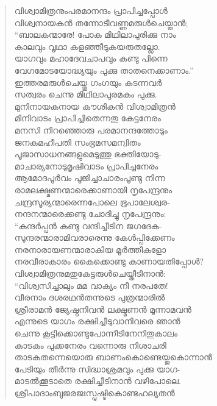 \begin{verse}
വിശ്വാമിത്രനുംപരമാനന്ദം പ്രാപിച്ചപ്പോള്‍\\
വിശ്വനായകന്‍ തന്നോടീവണ്ണമരുള്‍ചെയ്താന്‍;\\
“ബാലകന്മാരേ! പോക മിഥിലാപുരിക്കു നാം\\
കാലവും വൃഥാ കളഞ്ഞീടുകയരുതല്ലോ.\\
യാഗവും മഹാദേവചാപവും കണ്ടു പിന്നെ\\
വേഗമോടയോദ്ധ്യയും പുക്കു താതനെക്കാണാം.”\\
ഇത്തരമരുള്‍ചെയ്തു ഗംഗയും കടന്നവര്‍\\
സത്വരം ചെന്നു മിഥിലാപുരമകം പുക്കു.\\
മുനിനായകനായ കൗശികന്‍ വിശ്വാമിത്രന്‍\\
മിനിവാടം പ്രാപിച്ചിതെന്നതു കേട്ടനേരം\\
മനസി നിറഞ്ഞൊരു പരമാനന്ദത്തോടും\\
ജനകമഹീപതി സംഭ്രമസമന്വിതം\\
പൂജാസാധനങ്ങളുമെടുത്തു ഭക്തിയോടു-\\
മാചാര്യനോടുമൃഷിവാടം പ്രാപിച്ചനേരം\\
ആമോദപൂര്‍വം പൂജിച്ചാചാരംപൂണ്ടു നിന്ന\\
രാമലക്ഷ്മണന്മാരെക്കാണായി നൃപേന്ദ്രനും\\
ചന്ദ്രസൂര്യന്മാരെന്നപോലെ ഭൂപാലേശ്വര-\\
നന്ദനന്മാരെക്കണ്ടു ചോദിച്ചു നൃപേന്ദ്രനും:\\
“കന്ദര്‍പ്പന്‍ കണ്ടു വന്ദിച്ചീടിന ജഗദേക-\\
സുന്ദരന്മാരാമിവരാരെന്നു കേള്‍പ്പിക്കേണം\\
നരനാരായണന്മാരാകിയ മൂര്‍ത്തികളോ\\
നരവീരാകാരം കൈക്കൊണ്ടു കാണായതിപ്പോള്‍?\\
വിശ്വാമിത്രനുമതുകേട്ടരുള്‍ചെയ്തീടിനാന്‍:\\
“വിശ്വസിച്ചാലും മമ വാക്യം നീ നരപതേ!\\
വീരനാം ദശരഥന്‍തന്നുടെ പുത്രന്മാരില്‍\\
ശ്രീരാമന്‍ ജ്യേഷ്ഠനിവന്‍ ലക്ഷ്മണന്‍ മൂന്നാമവന്‍\\
എന്നുടെ യാഗം രക്ഷിച്ചീടുവാനിവരെ ഞാന്‍\\
ചെന്നു കൂട്ടിക്കൊണ്ടുപോന്നീടിനേനിതുകാലം\\
കാടകം പുക്കനേരം വന്നൊരു നിശാചരി\\
താടകതന്നെയൊരു ബാണംകൊണ്ടെയ്തുകൊന്നാന്‍\\
പേടിയും തീര്‍ന്നു സിദ്ധാശ്രമവും പുക്കു യാഗ-\\
മാടല്‍ക്കൂടാതെ രക്ഷിച്ചീടിനാന്‍ വഴിപോലെ.\\
ശ്രീപാദാംബുജരജഃസ്പൃഷ്ടികൊണ്ടഹല്യതന്‍\\

\end{verse}
